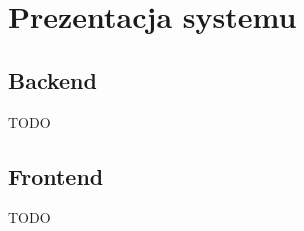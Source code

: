
\chapter{Prezentacja systemu}
\label{ch:prezentacja-systemu}

\section{Backend}
\label{sec:backend}

TODO

\section{Frontend}
\label{sec:frontend}

TODO
